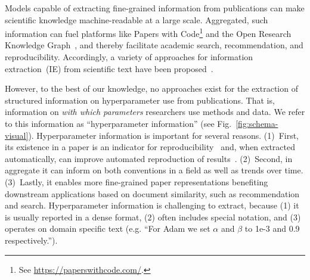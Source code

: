 
Models capable of extracting fine-grained information from publications can make scientific knowledge machine-readable at a large scale.
Aggregated, such information can fuel platforms like Papers with Code\footnote{See \url{https://paperswithcode.com/}.} and the Open Research Knowledge Graph~\cite{orkg1,orkg2}, and thereby facilitate academic search, recommendation,  and reproducibility.
Accordingly, a variety of approaches for information extraction~(IE) from scientific text have been proposed~\cite{luan2018scierc,Jain2020scirex,semeval21_task8,semeval22_task12,Dunn2022}.  %


However, to the best of our knowledge, no approaches exist for the extraction of structured information on hyperparameter use from publications.
That is, information on \emph{with which parameters} researchers use methods and data. We refer to this information as ``hyperparameter information'' (see Fig.~\ref{fig:schema-visual}).
Hyperparameter information is important for several reasons. (1)~First, its existence in a paper is an indicator for reproducibility~\cite{Radd2019} and, when extracted automatically, can improve automated reproduction of results~\cite{sethi2018}. (2)~Second, in aggregate it can inform on both conventions in a field as well as trends over time. (3)~Lastly, it enables more fine-grained paper representations benefiting downstream applications based on document similarity, such as recommendation and search. %
Hyperparameter information is challenging to extract, because (1) it is usually reported in a dense format, (2) often includes special notation, and (3) operates on domain specific text (e.g. ``For Adam we set $\alpha$ and $\beta$ to 1e-3 and 0.9 respectively.'').

